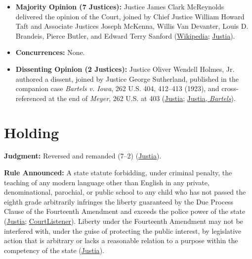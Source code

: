 \documentclass[12pt]{article}
\begin{document}
\begin{itemize}
\item \textbf{Majority Opinion (7 Justices):} Justice James Clark McReynolds delivered the opinion of the Court, joined by Chief Justice William Howard Taft and Associate Justices Joseph McKenna, Willis Van Devanter, Louis D. Brandeis, Pierce Butler, and Edward Terry Sanford (\href{https://en.wikipedia.org/wiki/Meyer_v._Nebraska}{Wikipedia}; \href{https://supreme.justia.com/cases/federal/us/262/390/}{Justia}).
\item \textbf{Concurrences:} None.
\item \textbf{Dissenting Opinion (2 Justices):} Justice Oliver Wendell Holmes, Jr. authored a dissent, joined by Justice George Sutherland, published in the companion case \textit{Bartels v. Iowa}, 262 U.S. 404, 412--413 (1923), and cross-referenced at the end of \textit{Meyer}, 262 U.S. at 403 (\href{https://supreme.justia.com/cases/federal/us/262/390/}{Justia}; \href{https://supreme.justia.com/cases/federal/us/262/404/}{Justia, \textit{Bartels}}).
\end{itemize}

\section{Holding}

\textbf{Judgment:} Reversed and remanded (7--2) (\href{https://supreme.justia.com/cases/federal/us/262/390/}{Justia}).

\textbf{Rule Announced:} A state statute forbidding, under criminal penalty, the teaching of any modern language other than English in any private, denominational, parochial, or public school to any child who has not passed the eighth grade arbitrarily infringes the liberty guaranteed by the Due Process Clause of the Fourteenth Amendment and exceeds the police power of the state (\href{https://supreme.justia.com/cases/federal/us/262/390/}{Justia}; \href{https://www.courtlistener.com/opinion/100233/meyer-v-nebraska/}{CourtListener}). Liberty under the Fourteenth Amendment may not be interfered with, under the guise of protecting the public interest, by legislative action that is arbitrary or lacks a reasonable relation to a purpose within the competency of the state (\href{https://supreme.justia.com/cases/federal/us/262/390/}{Justia}).
\end{document}
